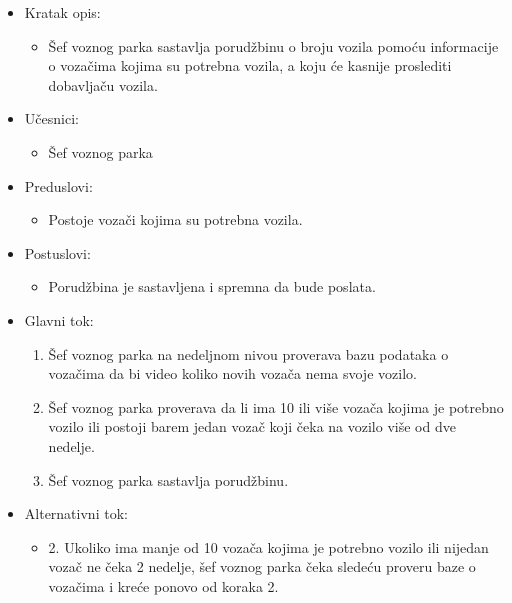 \begin{itemize}
	\item Kratak opis:
		\begin{itemize}
			\item Šef voznog parka sastavlja porudžbinu o broju vozila pomoću informacije o vozačima kojima su potrebna vozila, a koju će kasnije proslediti dobavljaču vozila.		
		\end{itemize}

	\item Učesnici:
		\begin{itemize}
		    \item Šef voznog parka
		\end{itemize}


	\item Preduslovi:
		\begin{itemize}
		    \item Postoje vozači kojima su potrebna vozila.
		\end{itemize}


	\item Postuslovi:
		\begin{itemize}
			\item Porudžbina je sastavljena i spremna da bude poslata.
	\end{itemize}

	\item Glavni tok:
		\begin{enumerate}
		    \item Šef voznog parka na nedeljnom nivou proverava bazu podataka o vozačima da bi video koliko novih vozača nema svoje vozilo.
		    \item Šef voznog parka proverava da li ima 10 ili više vozača kojima je potrebno vozilo ili postoji barem jedan vozač koji čeka na vozilo više od dve nedelje.
		    \item Šef voznog parka sastavlja porudžbinu.
		\end{enumerate}

	\item Alternativni tok:
		\begin{itemize}
		    \item 2. Ukoliko ima manje od 10 vozača kojima je potrebno vozilo ili nijedan vozač ne čeka 2 nedelje, šef voznog parka čeka sledeću proveru baze o vozačima i kreće ponovo od koraka 2.
		\end{itemize}

\end{itemize}


